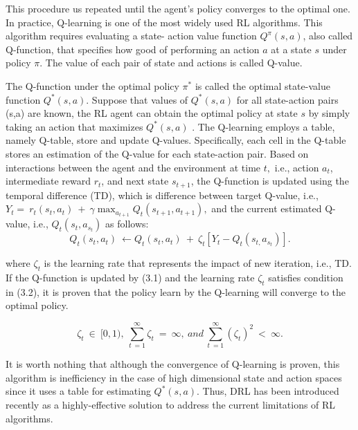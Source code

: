 \documentclass[letterpaper%
, twoside%
, 12pt%
,thesepararticles%
, english%
,creativecommons,hyperref, withAlgo2e%
]{thETS}
\begin{document}
\begin{enumerate}
\begin{enumerate}
{This procedure us repeated until the agent's policy converges to the optimal one. In practice, Q-learning is one of the most widely used RL algorithms. This algorithm requires evaluating a state- action value function $\displaystyle Q^{\pi }( s,a)$, also called Q-function, that specifies how good of performing an action $\displaystyle a$ at a state $\displaystyle s$ under policy $\displaystyle \pi $. The value of each pair of state and actions is called Q-value. 

The Q-function under the optimal policy $\displaystyle \pi ^{*}$ is called the optimal state-value function $\displaystyle Q^{*}( s,a)$. Suppose that values of $\displaystyle Q^{*}( s,a)$ for all state-action pairs (s,a) are known, the RL agent can obtain the optimal policy at state $\displaystyle s$ by simply taking an action that maximizes $\displaystyle Q^{*}( s,a)$ \cite{Sutton+Barto:1998}. The Q-learning employs a table, namely Q-table, store and update Q-values. Specifically, each cell in the Q-table stores an estimation of the Q-value for each state-action pair. Based on interactions between the agent and the environment at time $\displaystyle t,$ i.e., action $\displaystyle a_{t}$, intermediate reward $\displaystyle r_{t}$, and next state $\displaystyle s_{t+1}$, the Q-function is updated using the temporal difference (TD), which is difference between target Q-value, i.e., $\displaystyle Y_{t} =\ r_{t}( s_{t} ,a_{t}) \ +\ \gamma \max_{a_{t+1}} Q_{t}( s_{t+1} ,a_{t+1}) ,$ and the current estimated Q-value, i.e., $\displaystyle Q_{t}( s_{t} ,a_{s_{t}})$ as follows:
\begin{equation}
Q_{t}( s_{t} ,a_{t}) \ \leftarrow Q_{t}( s_{t} ,a_{t}) \ +\ \zeta _{t}[ Y_{t} -Q_{t}( s_{t,} a_{s_{t}})] .
\end{equation}

where $\displaystyle \zeta _{t}$ is the learning rate that represents the impact of new iteration, i.e., TD. If the Q-function is updated by (3.1) and the learning rate $\displaystyle \zeta _{t}$ satisfies condition in (3.2), it is proven that the policy learn by the Q-learning will converge to the optimal policy.

\begin{equation}
\zeta _{t} \ \in \ [ 0,1) ,\ \sum ^{\infty }_{t\ =1} \zeta _{t} \ =\ \infty ,\ and\ \sum ^{\infty }_{t\ =1}( \zeta _{t})^{2} \ < \ \infty .
\end{equation}

It is worth nothing that although the convergence of Q-learning is proven, this algorithm is inefficiency in the case of high dimensional state and action spaces since it uses a table for estimating $\displaystyle Q^{*}( s,a)$. Thus, DRL has been introduced recently as a highly-effective solution to address the current limitations of RL algorithms.

}	     	
	\end{enumerate} 
\end{enumerate}
\end{document}
